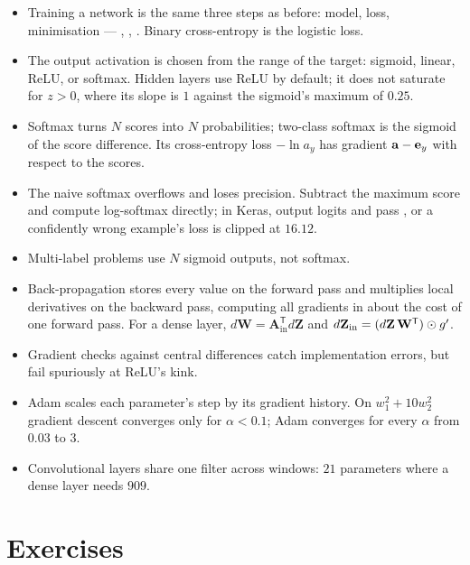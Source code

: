 \begin{itemize}
  \item Training a network is the same three steps as before: model, loss,
        minimisation --- , , . Binary
        cross-entropy is the logistic loss.
  \item The output activation is chosen from the range of the target: sigmoid,
        linear, ReLU, or softmax. Hidden layers use ReLU by default; it does not
        saturate for $z > 0$, where its slope is $1$ against the sigmoid's
        maximum of $0.25$.
  \item Softmax turns $N$ scores into $N$ probabilities; two-class softmax is the
        sigmoid of the score difference. Its cross-entropy loss $-\ln a_y$ has
        gradient $\mathbf{a} - \mathbf{e}_y$ with respect to the scores.
  \item The naive softmax overflows and loses precision. Subtract the maximum
        score and compute log-softmax directly; in Keras, output logits and pass
        , or a confidently wrong example's loss is
        clipped at $16.12$.
  \item Multi-label problems use $N$ sigmoid outputs, not softmax.
  \item Back-propagation stores every value on the forward pass and multiplies
        local derivatives on the backward pass, computing all gradients in about
        the cost of one forward pass. For a dense layer,
        $d\mathbf{W} = \mathbf{A}_{\text{in}}^{\mathsf{T}}d\mathbf{Z}$ and
        $d\mathbf{Z}_{\text{in}} = (d\mathbf{Z}\,\mathbf{W}^{\mathsf{T}})\odot g'$.
  \item Gradient checks against central differences catch implementation
        errors, but fail spuriously at ReLU's kink.
  \item Adam scales each parameter's step by its gradient history. On
        $w_1^2 + 10w_2^2$ gradient descent converges only for $\alpha < 0.1$;
        Adam converges for every $\alpha$ from $0.03$ to $3$.
  \item Convolutional layers share one filter across windows: $21$ parameters
        where a dense layer needs $909$.
\end{itemize}

\section*{Exercises}

